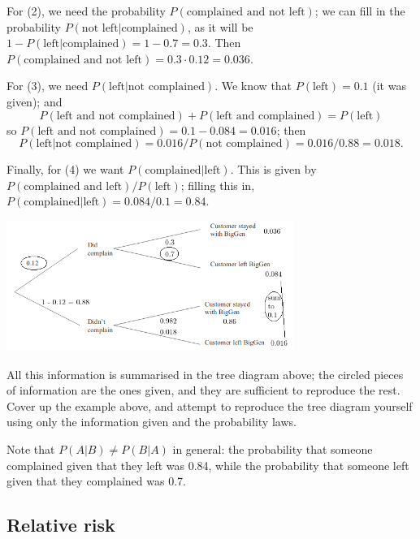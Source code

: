 \begin{ex}[NZQA, 2012]
  For (2), we need the probability $ P(\text{complained and not left}) $; we can fill in the probability $ P(\text{not left} | \text{complained}) $,
  as it will be $ 1 - P(\text{left} | \text{complained}) = 1 - 0.7 = 0.3 $. Then $ P(\text{complained and not left}) = 0.3 \cdot 0.12 = 0.036 $.

  For (3), we need $ P(\text{left} | \text{not complained}) $. We know that $ P(\text{left}) = 0.1 $ (it was given); and
  \begin{displaymath}
    P(\text{left and not complained}) + P(\text{left and complained}) = P(\text{left})
  \end{displaymath}
  so $ P(\text{left and not complained}) = 0.1 - 0.084 = 0.016 $; then
  \begin{displaymath}
    P(\text{left} | \text{not complained}) = 0.016/P(\text{not complained}) = 0.016/0.88 = 0.018.
  \end{displaymath}

  Finally, for (4) we want $ P(\text{complained} | \text{left}) $. This is given by $ P(\text{complained and left})/P(\text{left}) $;
  filling this in, $ P(\text{complained} | \text{left}) = 0.084/0.1 = 0.84 $.

  \begin{center}
    \includegraphics[width=0.7\textwidth]{powerco}
  \end{center}

  All this information is summarised in the tree diagram above; the circled pieces of information are the ones given, and they
  are sufficient to reproduce the rest. Cover up the example above, and attempt to reproduce the tree diagram yourself using only
  the information given and the probability laws.

  Note that $ P(A | B) \neq P(B | A) $ in general: the probability that someone complained given that they left was 0.84, while
  the probability that someone left given that they complained was 0.7.
\end{ex}

\subsection*{Relative risk}

